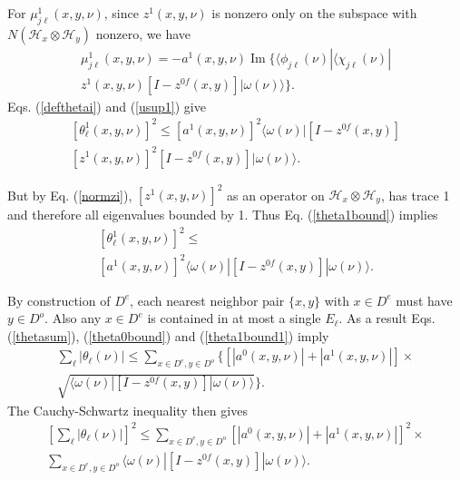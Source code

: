 \documentclass[twocolumn,amsmath,amssymb]{revtex4-1}
\begin{document}
For $\mu^1_{j\ell}(x,y,\nu)$, since $z^1(x,y,\nu)$ is nonzero only on the
subspace with $N(\mathcal{H}_x \otimes \mathcal{H}_y)$ nonzero, we have
\begin{multline}
\label{usup1}
\mu^1_{j\ell}(x,y,\nu) =  -a^1(x,y,\nu) \operatorname{Im}\{  \langle \phi_{j\ell}(\nu)| \langle \chi_{j\ell}(\nu)| \\
z^1(x,y,\nu) [I - z^{0f}(x,y)]|\omega(\nu) \rangle \}.
\end{multline}
Eqs. (\ref{defthetai}) and (\ref{usup1}) give
\begin{multline}
\label{theta1bound}
[\theta^1_{\ell}(x,y,\nu)]^2 \le [a^1(x,y,\nu)]^2  \langle  \omega(\nu)| 
[I - z^{0f}(x,y)] \\
[z^1(x,y,\nu)]^2[I - z^{0f}(x,y)]|\omega(\nu) \rangle .
\end{multline}


But by Eq. (\ref{normzi}), $[z^1(x,y,\nu)]^2$ as an operator on 
$\mathcal{H}_x \otimes \mathcal{H}_y$, 
has trace 1 and therefore all eigenvalues
bounded by 1. Thus Eq. (\ref{theta1bound}) implies
\begin{multline}
\label{theta1bound1}
[\theta^1_{\ell}(x,y,\nu)]^2 \le \\ 
[a^1(x,y,\nu)]^2  \langle  \omega(\nu)| [I - z^{0f}(x,y)]|\omega(\nu) \rangle .
\end{multline}



By construction of $D^e$, each nearest neighbor pair $\{x,  y\}$ with $x \in D^e$
must have $y \in D^o$. Also any $x \in D^e$ is contained in at most
a single $E_\ell$.
As a result
Eqs. (\ref{thetasum}), (\ref{theta0bound}) and (\ref{theta1bound1}) imply
\begin{multline}
\label{thetafinal0}
\sum_{\ell} |\theta_{\ell}(\nu)| \le 
\sum_{x \in D^e, y \in D^o}  \{ [|a^0(x,y,\nu)| + |a^1(x,y,\nu)|] \times
\\ \sqrt{  \langle \omega(\nu)| [I - z^{0f}(x,y)]|\omega(\nu) \rangle } \}.
\end{multline}
The Cauchy-Schwartz inequality then gives
\begin{multline}
\label{thetafinal}
[\sum_{\ell} |\theta_{\ell}(\nu)|] ^ 2 \le
\sum_{x \in D^e, y \in D^o} [|a^0(x,y,\nu)| + |a^1(x,y,\nu)|]^2 \times
\\ \sum_{x \in D^e, y \in D^o}  \langle \omega(\nu)| [I - z^{0f}(x,y)]|\omega(\nu) \rangle .
\end{multline}
\end{document}
